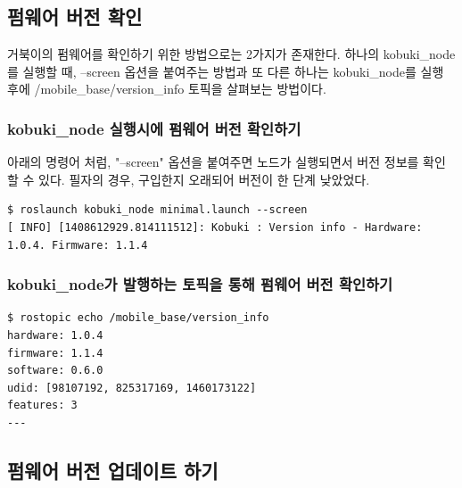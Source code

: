 \subsection{펌웨어 버전 확인}
\label{subsec:FirmwareUpdate}

거북이의 펌웨어를 확인하기 위한 방법으로는 2가지가 존재한다. 하나의 kobuki\_node를 실행할 때, --screen 옵션을 붙여주는 방법과 또 다른 하나는 kobuki\_node를 실행 후에 /mobile\_base/version\_info 토픽을 살펴보는 방법이다.

\subsubsection{kobuki\_node 실행시에 펌웨어 버전 확인하기 }

아래의 명령어 처럼, "--screen" 옵션을 붙여주면 노드가 실행되면서 버전 정보를 확인할 수 있다. 필자의 경우, 구입한지 오래되어 버전이 한 단계 낮았었다.

\vspace{\baselineskip}
\begin{lstlisting}[language=ROS]
$ roslaunch kobuki_node minimal.launch --screen
[ INFO] [1408612929.814111512]: Kobuki : Version info - Hardware: 1.0.4. Firmware: 1.1.4
\end{lstlisting}


\subsubsection{kobuki\_node가 발행하는 토픽을 통해 펌웨어 버전 확인하기}

\vspace{\baselineskip}
\begin{lstlisting}[language=ROS]
$ rostopic echo /mobile_base/version_info 
hardware: 1.0.4
firmware: 1.1.4
software: 0.6.0
udid: [98107192, 825317169, 1460173122]
features: 3
---
\end{lstlisting}

\subsection{펌웨어 버전 업데이트 하기}

